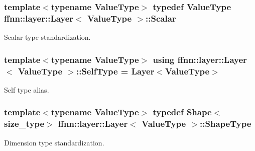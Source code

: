 \hypertarget{classffnn_1_1layer_1_1_layer_ab3b9b082aed9ee8d4e30a823b723a740}{
\subsubsection[{Scalar}]{\setlength{\rightskip}{0pt plus 5cm}template$<$typename Value\-Type$>$ typedef Value\-Type {\bf ffnn\-::layer\-::\-Layer}$<$ Value\-Type $>$\-::{\bf Scalar}}}\label{classffnn_1_1layer_1_1_layer_ab3b9b082aed9ee8d4e30a823b723a740}


Scalar type standardization. 

\hypertarget{classffnn_1_1layer_1_1_layer_a01db5ce644b97af72dca31a759aa33c5}{
\subsubsection[{Self\-Type}]{\setlength{\rightskip}{0pt plus 5cm}template$<$typename Value\-Type$>$ using {\bf ffnn\-::layer\-::\-Layer}$<$ Value\-Type $>$\-::{\bf Self\-Type} =  {\bf Layer}$<$Value\-Type$>$}}\label{classffnn_1_1layer_1_1_layer_a01db5ce644b97af72dca31a759aa33c5}


Self type alias. 

\hypertarget{classffnn_1_1layer_1_1_layer_ae2f2d0063ab4b2c2a3a6ebf81f4ec32f}{
\subsubsection[{Shape\-Type}]{\setlength{\rightskip}{0pt plus 5cm}template$<$typename Value\-Type$>$ typedef {\bf Shape}$<${\bf size\-\_\-type}$>$ {\bf ffnn\-::layer\-::\-Layer}$<$ Value\-Type $>$\-::{\bf Shape\-Type}}}\label{classffnn_1_1layer_1_1_layer_ae2f2d0063ab4b2c2a3a6ebf81f4ec32f}


Dimension type standardization. 



